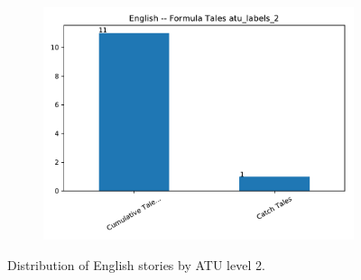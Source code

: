 \begin{figure}
\begin{subfigure}{.5\textwidth}
\includegraphics[width=0.9\linewidth]{plots/bars11.pdf}
\end{subfigure}%
\caption{Distribution of English stories by ATU level 2.}
\label{fig:bars}
\end{figure}
